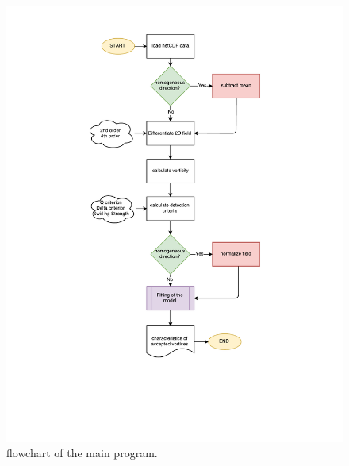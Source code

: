\documentclass[12pt, a4paper, openany]{memoir}
\begin{document}
\begin{figure}[h!]
	\centering
	\includegraphics[trim=150 150 150 50 ,clip, scale=0.8]{figure/vortexFittingFlow.pdf}
	\caption{flowchart of the main program.}
	\label{fig:mainprogramfc}
\end{figure}
\end{document}
